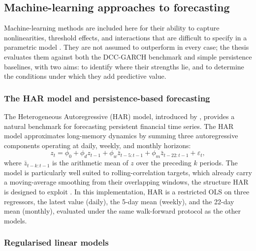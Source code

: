 \subsection{Machine-learning approaches to forecasting}

Machine-learning methods are included here for their ability to capture nonlinearities, threshold effects, and interactions that are difficult to specify in a parametric model \cite{gu2020empirical}. They are not assumed to outperform in every case; the thesis evaluates them against both the DCC-GARCH benchmark and simple persistence baselines, with two aims: to identify where their strengths lie, and to determine the conditions under which they add predictive value.

\subsubsection{The HAR model and persistence-based forecasting}

The Heterogeneous Autoregressive (HAR) model, introduced by \cite{corsi2009har}, provides a natural benchmark for forecasting persistent financial time series. The HAR model approximates long-memory dynamics by summing three autoregressive components operating at daily, weekly, and monthly horizons:
\begin{equation}
    z_t = \phi_0 + \phi_d z_{t-1} + \phi_w \bar{z}_{t-5:t-1}
          + \phi_m \bar{z}_{t-22:t-1} + \varepsilon_t,
\end{equation}
where $\bar{z}_{t-k:t-1}$ is the arithmetic mean of $z$ over the preceding $k$ periods. The model is particularly well suited to rolling-correlation targets, which already carry a moving-average smoothing from their overlapping windows, the structure HAR is designed to exploit \cite{andersen2003realized}. In this implementation, HAR is a restricted OLS on three regressors, the latest value (daily), the 5-day mean (weekly), and the 22-day mean (monthly), evaluated under the same walk-forward protocol as the other models.

\subsubsection{Regularised linear models}

